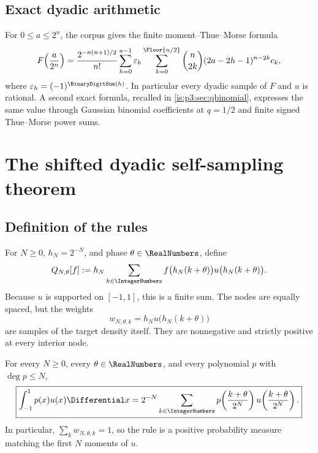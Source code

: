 \subsection{Exact dyadic arithmetic}

For $0\le a\le2^n$, the corpus gives the finite moment--Thue--Morse formula
\begin{equation}
 F\!\left(\frac a{2^n}\right)
 =\frac{2^{-n(n+1)/2}}{n!}
 \sum_{h=0}^{a-1}\eps_h
 \sum_{k=0}^{\Floor{n/2}}
 \binom n{2k}(2a-2h-1)^{n-2k}c_k,
 \label{is:p3:eq:finite-F-moment}
\end{equation}
where $\eps_h=(-1)^{\BinaryDigitSum(h)}$.  In particular every dyadic sample of $F$ and $u$ is rational.  A second exact formula, recalled in \cref{is:p3:sec:qbinomial}, expresses the same value through Gaussian binomial coefficients at $q=1/2$ and finite signed Thue--Morse power sums.

\section{The shifted dyadic self-sampling theorem}
\label{is:p3:sec:self-sampling}

\subsection{Definition of the rules}

For $N\ge0$, $h_N=2^{-N}$, and phase $\theta\in\RealNumbers$, define
\begin{equation}
 Q_{N,\theta}[f]
 :=h_N\sum_{k\in\IntegerNumbers}
 f\bigl(h_N(k+\theta)\bigr)
 u\bigl(h_N(k+\theta)\bigr).
 \label{is:p3:eq:Q-def}
\end{equation}
Because $u$ is supported on $[-1,1]$, this is a finite sum.  The nodes are equally spaced, but the weights
\begin{equation}
 w_{N,\theta,k}=h_Nu\bigl(h_N(k+\theta)\bigr)
 \label{is:p3:eq:self-weights}
\end{equation}
are samples of the target density itself.  They are nonnegative and strictly positive at every interior node.

\begin{theorem}
\label{is:p3:thm:self-sampling}
For every $N\ge0$, every $\theta\in\RealNumbers$, and every polynomial $p$ with $\deg p\le N$,
\begin{equation}
 \boxed{\displaystyle
 \int_{-1}^{1}p(x)u(x)\Differential x
 =2^{-N}\sum_{k\in\IntegerNumbers}
 p\!\left(\frac{k+\theta}{2^N}\right)
 u\!\left(\frac{k+\theta}{2^N}\right).}
 \label{is:p3:eq:self-sampling-main}
\end{equation}
In particular, $\sum_k w_{N,\theta,k}=1$, so the rule is a positive probability measure matching the first $N$ moments of $u$.
\end{theorem}


